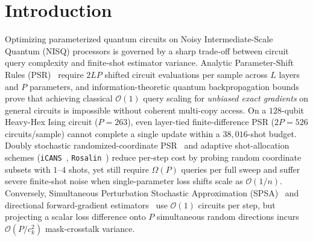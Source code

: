 \documentclass[11pt]{article}
\begin{document}
\begin{abstract}
edge-correlation fidelity vs.\ held-out Simulated Annealing) and $75.1\%$ vs.\ $47.5\%$ promoter activity over live SPSA on $128$-qubit DNA. Finally, we pair every benchmark with diagnostic negative controls—exposing session-specific hardware-drift sector locking ($\overline{|m_i|}{=}0.485$ even at $\boldsymbol{\theta}{=}\mathbf{0}$), classical sign-Hebbian equivalence on standalone spin glasses, $1$-body dominance on $L{=}2$ DNA, linear conditioning shortcuts on whitened vision latents, and Straight-Through Estimator (\texttt{STE}) parity when quantum weights are frozen.
\end{abstract}

\section{Introduction}
\label{sec:intro}
Optimizing parameterized quantum circuits on Noisy Intermediate-Scale Quantum (NISQ) processors is governed by a sharp trade-off between circuit query complexity and finite-shot estimator variance. Analytic Parameter-Shift Rules (PSR)~\cite{mitarai2018psr,schuld2019psr} require $2LP$ shifted circuit evaluations per sample across $L$ layers and $P$ parameters, and information-theoretic quantum backpropagation bounds~\cite{abbas2023qbp} prove that achieving classical $\mathcal{O}(1)$ query scaling for \emph{unbiased exact gradients} on general circuits is impossible without coherent multi-copy access. On a $128$-qubit Heavy-Hex Ising circuit ($P{=}263$), even layer-tied finite-difference PSR ($2P{=}526$ circuits/sample) cannot complete a single update within a $38{,}016$-shot budget. Doubly stochastic randomized-coordinate PSR~\cite{sweke2020sgd} and adaptive shot-allocation schemes (\texttt{iCANS}~\cite{kubler2020icans}, \texttt{Rosalin}~\cite{arrasmith2020rosalin}) reduce per-step cost by probing random coordinate subsets with $1$--$4$ shots, yet still require $\Omega(P)$ queries per full sweep and suffer severe finite-shot noise when single-parameter loss shifts scale as $\mathcal{O}(1/n)$. Conversely, Simultaneous Perturbation Stochastic Approximation (SPSA)~\cite{spall1992spsa,kandala2017vqe} and directional forward-gradient estimators~\cite{coyle2026forward} use $\mathcal{O}(1)$ circuits per step, but projecting a scalar loss difference onto $P$ simultaneous random directions incurs $\mathcal{O}(P/c_k^2)$ mask-crosstalk variance.
\end{document}
